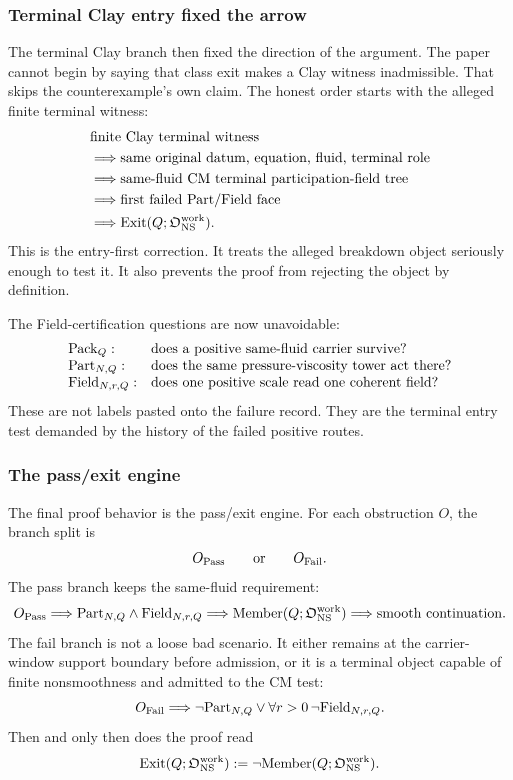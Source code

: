 \subsubsection{Terminal Clay entry fixed the arrow}

The terminal Clay branch then fixed the direction of the argument.
The paper cannot begin by saying that class exit makes a Clay witness
inadmissible.
That skips the counterexample's own claim.
The honest order starts with the alleged finite terminal witness:
\[
  \begin{aligned}
  &\text{finite Clay terminal witness}\\
  &\Longrightarrow
  \text{same original datum, equation, fluid, terminal role}\\
  &\Longrightarrow
  \text{same-fluid CM terminal participation-field tree}\\
  &\Longrightarrow
  \text{first failed Part/Field face}\\
  &\Longrightarrow
  \mathrm{Exit}(Q;\mathfrak O_{\mathrm{NS}}^{\mathrm{work}}).
  \end{aligned}
\]
This is the entry-first correction.
It treats the alleged breakdown object seriously enough to test it.
It also prevents the proof from rejecting the object by definition.

The Field-certification questions are now unavoidable:
\[
  \begin{array}{ll}
  \mathrm{Pack}_Q: & \text{does a positive same-fluid carrier survive?}\\
  \mathrm{Part}_{N,Q}: & \text{does the same pressure-viscosity tower act there?}\\
  \mathrm{Field}_{N,r,Q}: & \text{does one positive scale read one coherent field?}
  \end{array}
\]
These are not labels pasted onto the failure record.
They are the terminal entry test demanded by the history of the failed
positive routes.

\subsubsection{The pass/exit engine}

The final proof behavior is the pass/exit engine.
For each obstruction \(O\), the branch split is
\[
  O_{\mathrm{Pass}}
  \qquad\text{or}\qquad
  O_{\mathrm{Fail}}.
\]
The pass branch keeps the same-fluid requirement:
\[
  O_{\mathrm{Pass}}
  \Longrightarrow
  \mathrm{Part}_{N,Q}\wedge\mathrm{Field}_{N,r,Q}
  \Longrightarrow
  \mathrm{Member}(Q;\mathfrak O_{\mathrm{NS}}^{\mathrm{work}})
  \Longrightarrow
  \text{smooth continuation}.
\]
The fail branch is not a loose bad scenario.
It either remains at the carrier-window support boundary before admission, or it
is a terminal object capable of finite nonsmoothness and admitted to the CM test:
\[
  O_{\mathrm{Fail}}
  \Longrightarrow
  \neg\mathrm{Part}_{N,Q}
  \vee
  \forall r>0\,\neg\mathrm{Field}_{N,r,Q}.
\]
Then and only then does the proof read
\[
  \mathrm{Exit}(Q;\mathfrak O_{\mathrm{NS}}^{\mathrm{work}}):=\neg\mathrm{Member}(Q;\mathfrak O_{\mathrm{NS}}^{\mathrm{work}}).
\]

